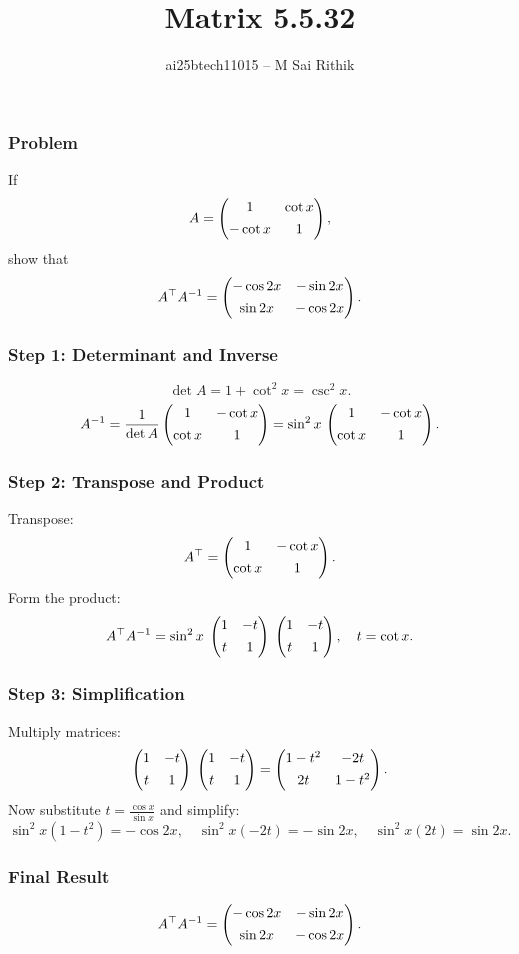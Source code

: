 \documentclass{beamer}
\title{Matrix 5.5.32}
\author{ai25btech11015 -- M Sai Rithik}
\date{}
\begin{document}
\frame{\titlepage}

\begin{frame}
\frametitle{Problem}
If
\[
A = \begin{pmatrix}1 & \cot x \\[4pt] -\cot x & 1\end{pmatrix},
\]
show that
\[
A^{\top} A^{-1} = 
\begin{pmatrix}-\cos 2x & -\sin 2x \\[4pt] \sin 2x & -\cos 2x\end{pmatrix}.
\]
\end{frame}

\begin{frame}
\frametitle{Step 1: Determinant and Inverse}
\[
\det A = 1 + \cot^2 x = \csc^2 x.
\]
\[
A^{-1} 
= \frac{1}{\det A}\begin{pmatrix}1 & -\cot x \\[4pt]\cot x & 1\end{pmatrix}
= \sin^2 x \,\begin{pmatrix}1 & -\cot x \\[4pt]\cot x & 1\end{pmatrix}.
\]
\end{frame}

\begin{frame}
\frametitle{Step 2: Transpose and Product}
Transpose:
\[
A^{\top} = \begin{pmatrix}1 & -\cot x \\[4pt]\cot x & 1\end{pmatrix}.
\]
Form the product:
\[
A^{\top} A^{-1} 
= \sin^2 x \;\begin{pmatrix}1 & -t \\[4pt] t & 1\end{pmatrix}\;\begin{pmatrix}1 & -t \\[4pt] t & 1\end{pmatrix}, 
\quad t=\cot x.
\]
\end{frame}

\begin{frame}
\frametitle{Step 3: Simplification}
Multiply matrices:
\[
\begin{pmatrix}1 & -t \\[4pt] t & 1\end{pmatrix}\;\begin{pmatrix}1 & -t \\[4pt] t & 1\end{pmatrix}
= \begin{pmatrix}1-t^2 & -2t \\[4pt] 2t & 1-t^2\end{pmatrix}.
\]
Now substitute \(t=\frac{\cos x}{\sin x}\) and simplify:
\[
\sin^2 x(1-t^2) = -\cos 2x,
\quad 
\sin^2 x(-2t) = -\sin 2x,
\quad 
\sin^2 x(2t) = \sin 2x.
\]
\end{frame}

\begin{frame}
\frametitle{Final Result}
\[
A^{\top} A^{-1} =
\begin{pmatrix}-\cos 2x & -\sin 2x \\[4pt] \sin 2x & -\cos 2x\end{pmatrix}.
\]
\end{frame}
\end{document}
